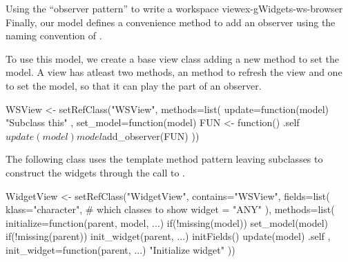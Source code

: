 \begin{example}{Using the ``observer pattern'' to write a workspace view}{ex-gWidgets-ws-browser}
Finally, our model defines a convenience method to add an observer
using the naming convention of .
\begin{Schunk}
\end{Schunk}


To use this model, we create a base view class adding a new method to
set the model. A view has atleast two methods, an 
method to refresh the view and one to set the model, so that it can
play the part of an observer. 
\begin{Schunk}
\begin{Sinput}
 WSView <- setRefClass("WSView",
                       methods=list(
                         update=function(model) {
                           "Subclass this"
                         },
                         set_model=function(model) {
                           FUN <- function() .self$update(model)
                           model$add_observer(FUN)
                         }
                         ))
\end{Sinput}
\end{Schunk}
%

The following  class uses the template method
pattern leaving subclasses to construct the widgets through the call
to . 

\begin{Schunk}
\begin{Sinput}
 WidgetView <- 
   setRefClass("WidgetView",
               contains="WSView",
               fields=list(
                 klass="character", # which classes to show
                 widget = "ANY"
                 ),
               methods=list(
                 initialize=function(parent, model, ...) {
                   if(!missing(model)) set_model(model)
                   if(!missing(parent)) init_widget(parent, ...)
                   initFields()
                   update(model)
                   .self
                 },
                 init_widget=function(parent, ...) {
                   "Initialize widget"
                 }))
\end{Sinput}
\end{Schunk}
% 


%


\end{example}
